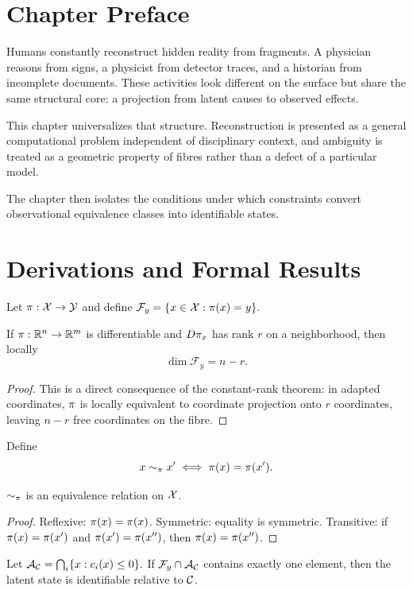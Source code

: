 \section{Chapter Preface}
Humans constantly reconstruct hidden reality from fragments. A physician reasons from signs, a physicist from detector traces, and a historian from incomplete documents. These activities look different on the surface but share the same structural core: a projection from latent causes to observed effects.

This chapter universalizes that structure. Reconstruction is presented as a general computational problem independent of disciplinary context, and ambiguity is treated as a geometric property of fibres rather than a defect of a particular model.

The chapter then isolates the conditions under which constraints convert observational equivalence classes into identifiable states.

\section{Derivations and Formal Results}
Let \(\pi:\mathcal{X}\to\mathcal{Y}\) and define \(\mathcal F_y=\{x\in\mathcal{X}:\pi(x)=y\}.\)

\begin{theorem}
If \(\pi:\mathbb R^n\to\mathbb R^m\) is differentiable and \(D\pi_x\) has rank \(r\) on a neighborhood, then locally
\[
\dim \mathcal F_y = n-r.
\]
\end{theorem}

\begin{proof}
This is a direct consequence of the constant-rank theorem: in adapted coordinates, \(\pi\) is locally equivalent to coordinate projection onto \(r\) coordinates, leaving \(n-r\) free coordinates on the fibre.
\end{proof}

\begin{definition}
Define
\[
x\sim_{\pi}x'\iff\pi(x)=\pi(x').
\]
\end{definition}

\begin{proposition}
\(\sim_{\pi}\) is an equivalence relation on \(\mathcal{X}\).
\end{proposition}

\begin{proof}
Reflexive: \(\pi(x)=\pi(x)\). Symmetric: equality is symmetric. Transitive: if \(\pi(x)=\pi(x')\) and \(\pi(x')=\pi(x'')\), then \(\pi(x)=\pi(x'')\).
\end{proof}

\begin{theorem}
\label{thm:constraint-induced-identifiability}
Let \(\mathcal{A}_{\mathcal{C}}=\bigcap_i\{x:c_i(x)\le0\}.\) If \(\mathcal F_y\cap\mathcal{A}_{\mathcal{C}}\) contains exactly one element, then the latent state is identifiable relative to \(\mathcal{C}\).
\end{theorem}

